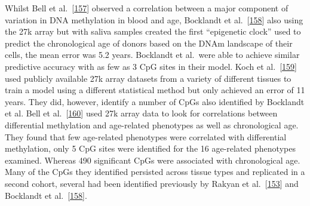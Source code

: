 \documentclass[
]{book}
\begin{document}
Whilst Bell et al.~{[}\protect\hyperlink{ref-Bell2010}{157}{]} observed a correlation between a major component of variation in DNA methylation in blood and age, Bocklandt et al.~{[}\protect\hyperlink{ref-Bocklandt2011}{158}{]} also using the 27k array but with saliva samples created the first ``epigenetic clock'' used to predict the chronological age of donors based on the DNAm landscape of their cells, the mean error was 5.2 years.
Bocklandt et al.~were able to achieve similar predictive accuracy with as few as 3 CpG sites in their model.
Koch et al.~{[}\protect\hyperlink{ref-Koch2011}{159}{]} used publicly available 27k array datasets from a variety of different tissues to train a model using a different statistical method but only achieved an error of 11 years.
They did, however, identify a number of CpGs also identified by Bocklandt et al.
Bell et al.~{[}\protect\hyperlink{ref-Bell2012}{160}{]} used 27k array data to look for correlations between differential methylation and age-related phenotypes as well as chronological age.
They found that few age-related phenotypes were correlated with differential methylation, only 5 CpG sites were identified for the 16 age-related phenotypes examined. Whereas 490 significant CpGs were associated with chronological age.
Many of the CpGs they identified persisted across tissue types and replicated in a second cohort, several had been identified previously by Rakyan et al.~{[}\protect\hyperlink{ref-Rakyan2010}{153}{]} and Bocklandt et al.~{[}\protect\hyperlink{ref-Bocklandt2011}{158}{]}.
\end{document}

